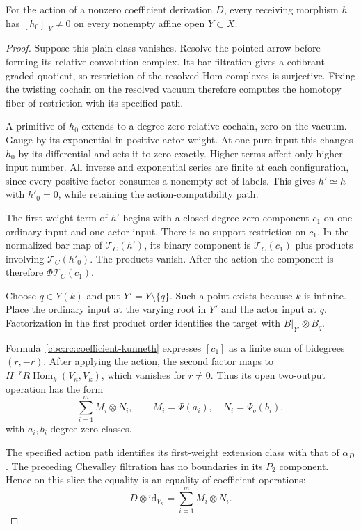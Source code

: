 \begin{theorem}\label{cbc:rc:singleton-survival}
For the action of a nonzero coefficient derivation
$D$, every receiving morphism $h$ has
$[h_0]|_Y\ne0$ on every nonempty affine open
$Y\subset X$.
\end{theorem}
\begin{proof}
Suppose this plain class vanishes. Resolve the
pointed arrow before forming its relative
convolution complex. Its bar filtration gives
a cofibrant graded quotient, so restriction
of the resolved Hom complexes is surjective.
Fixing the twisting cochain on the resolved
vacuum therefore computes the homotopy fiber
of restriction with its specified path.

A primitive of $h_0$ extends to a degree-zero
relative cochain, zero on the vacuum. Gauge
by its exponential in positive actor weight.
At one pure input this changes $h_0$ by its
differential and sets it to zero exactly.
Higher terms affect only higher input number.
All inverse and exponential series are finite
at each configuration, since every positive
factor consumes a nonempty set of labels.
This gives $h'\simeq h$ with $h'_0=0$, while
retaining the action-compatibility path.

The first-weight term of $h'$ begins with a
closed degree-zero component $c_1$ on one
ordinary input and one actor input. There
is no support restriction on $c_1$.
In the normalized bar map of
$\mathcal T_C(h')$, its binary component
is $\mathcal T_C(c_1)$ plus products involving
$\mathcal T_C(h'_0)$. The products vanish.
After the action the component is therefore
$\Phi\mathcal T_C(c_1)$.

Choose $q\in Y(k)$ and put $Y'=Y\setminus\{q\}$.
Such a point exists because $k$ is infinite.
Place the ordinary input at the varying root
in $Y'$ and the actor input at $q$.
Factorization in the first product order
identifies the target with $B|_{Y'}\otimes B_q$.

Formula~\eqref{cbc:rc:coefficient-kunneth}
expresses $[c_1]$ as a finite sum of bidegrees
$(r,-r)$. After applying the action, the
second factor maps to
$H^{-r}R\operatorname{Hom}_k(V_\kappa,V_\kappa)$,
which vanishes for $r\ne0$.
Thus its open two-output operation has the form
\[
 \sum_{i=1}^m M_i\otimes N_i,
 \qquad M_i=\Psi(a_i),\quad N_i=\Psi_q(b_i),
\]
with $a_i,b_i$ degree-zero classes.

The specified action path identifies its
first-weight extension class with that of
$\alpha_D$. The preceding Chevalley filtration
has no boundaries in its $P_2$ component.
Hence on this slice the equality is an
equality of coefficient operations:
\[
 D\otimes\mathrm{id}_{V_\kappa}
        =\sum_{i=1}^m M_i\otimes N_i.
\]


\end{proof}

